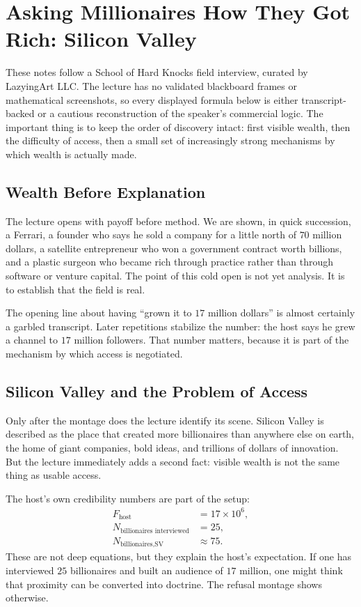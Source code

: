 \chapter{Asking Millionaires How They Got Rich: Silicon Valley}

These notes follow a School of Hard Knocks field interview, curated by LazyingArt LLC. The lecture has no validated blackboard frames or mathematical screenshots, so every displayed formula below is either transcript-backed or a cautious reconstruction of the speaker's commercial logic. The important thing is to keep the order of discovery intact: first visible wealth, then the difficulty of access, then a small set of increasingly strong mechanisms by which wealth is actually made.

\section{Wealth Before Explanation}

The lecture opens with payoff before method. We are shown, in quick succession, a Ferrari, a founder who says he sold a company for a little north of \(70\) million dollars, a satellite entrepreneur who won a government contract worth billions, and a plastic surgeon who became rich through practice rather than through software or venture capital. The point of this cold open is not yet analysis. It is to establish that the field is real.

The opening line about having ``grown it to \(17\) million dollars'' is almost certainly a garbled transcript. Later repetitions stabilize the number: the host says he grew a channel to \(17\) million followers. That number matters, because it is part of the mechanism by which access is negotiated.

\section{Silicon Valley and the Problem of Access}

Only after the montage does the lecture identify its scene. Silicon Valley is described as the place that created more billionaires than anywhere else on earth, the home of giant companies, bold ideas, and trillions of dollars of innovation. But the lecture immediately adds a second fact: visible wealth is not the same thing as usable access.

The host's own credibility numbers are part of the setup:
\begin{align}
F_{\text{host}} &= 17 \times 10^6,\\
N_{\text{billionaires interviewed}} &= 25,\\
N_{\text{billionaires,SV}} &\approx 75.
\end{align}
These are not deep equations, but they explain the host's expectation. If one has interviewed \(25\) billionaires and built an audience of \(17\) million, one might think that proximity can be converted into doctrine. The refusal montage shows otherwise.

